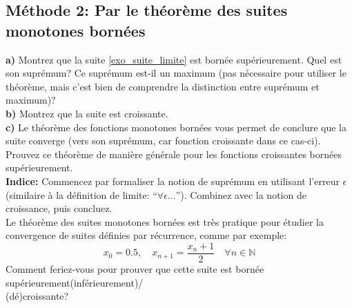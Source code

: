 \documentclass[a4paper, 12pt, french, twoside]{article}
\newcommand{\Nn}{{\mathbb{N}}}
\begin{document}
\subsection{Méthode 2: Par le théorème des suites monotones bornées}
\textbf{a)} Montrez que la suite \eqref{exo_suite_limite} est bornée supérieurement. Quel est son suprémum? Ce suprémum est-il un maximum (pas nécessaire pour utiliser le théorème, mais c'est bien de comprendre la distinction entre suprémum et maximum)?\\

\textbf{b)} Montrez que la suite est croissante.\\

\textbf{c)} Le théorème des fonctions monotones bornées vous permet de conclure que la suite converge (vers son suprémum, car fonction croissante dans ce cas-ci). \\ Prouvez ce théorème de manière générale pour les fonctions croissantes bornées supérieurement.\\
\textbf{Indice:} Commencez par formaliser la notion de suprémum en utilisant l'erreur $\epsilon$ (similaire à la définition de limite: ``$\forall \epsilon ...$''). Combinez avec la notion de croissance, puis concluez.\\

\faLightbulbO \quad {} Le théorème des suites monotones bornées est très pratique pour étudier la convergence de suites définies par récurrence, comme par exemple:
\begin{equation}
    x_0 = 0.5, \quad x_{n+1} = \frac{x_n + 1}{2} \quad \forall n\in \Nn
\end{equation}
Comment feriez-vous pour prouver que cette suite est bornée supérieurement(inférieurement)/\\ (dé)croissante?
\end{document}
